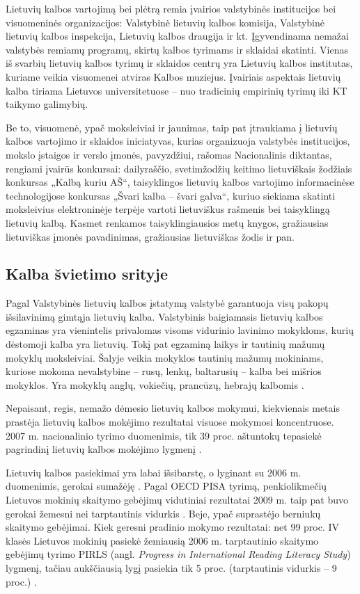 \begin{multicols}{2}
    Lietuvių kalbos vartojimą bei plėtrą remia įvairios valstybinės institucijos bei visuomeninės organizacijos: Valstybinė lietuvių kalbos komisija, Valstybinė lietuvių kalbos inspekcija, Lietuvių kalbos draugija ir kt. Įgyvendinama nemažai valstybės remiamų programų, skirtų kalbos tyrimams ir sklaidai skatinti.
Vienas iš svarbių lietuvių kalbos tyrimų ir sklaidos centrų yra Lietuvių kalbos institutas, kuriame veikia visuomenei atviras Kalbos muziejus. Įvairiais aspektais lietuvių kalba tiriama Lietuvos universitetuose – nuo tradicinių empirinių tyrimų iki KT taikymo galimybių.

Be to, visuomenė, ypač moksleiviai ir jaunimas, taip pat įtraukiama į lietuvių kalbos vartojimo ir sklaidos iniciatyvas, kurias organizuoja valstybės institucijos, mokslo įstaigos ir verslo įmonės, pavyzdžiui, rašomas Nacionalinis diktantas, rengiami įvairūs konkursai: dailyraščio, svetimžodžių keitimo lietuviškais žodžiais konkursas „Kalbą kuriu AŠ“, taisyklingos lietuvių kalbos vartojimo informacinėse technologijose konkursas „Švari kalba – švari galva“, kuriuo siekiama skatinti moksleivius elektroninėje terpėje vartoti lietuviškus rašmenis bei taisyklingą lietuvių kalbą. Kasmet renkamos taisyklingiausios metų knygos, gražiausias lietuviškas įmonės pavadinimas, gražiausias lietuviškas žodis ir pan.

\subsection{Kalba švietimo srityje}

Pagal Valstybinės lietuvių kalbos įstatymą valstybė garantuoja visų pakopų išsilavinimą gimtąja lietuvių kalba. Valstybinis baigiamasis lietuvių kalbos egzaminas yra vienintelis privalomas visoms vidurinio lavinimo mokykloms, kurių dėstomoji kalba yra lietuvių. Tokį pat egzaminą laikys ir tautinių mažumų mokyklų moksleiviai. Šalyje veikia mokyklos tautinių mažumų mokiniams, kuriose mokoma nevalstybine – rusų, lenkų, baltarusių – kalba bei mišrios mokyklos. Yra mokyklų anglų, vokiečių, prancūzų, hebrajų kalbomis \cite{smm1}.  

    Nepaisant, regis, nemažo dėmesio lietuvių kalbos mokymui, kiekvienais metais prastėja lietuvių kalbos mokėjimo rezultatai visuose mokymosi koncentruose. 2007 m. nacionalinio tyrimo duomenimis, tik 39 proc. aštuntokų tepasiekė pagrindinį lietuvių kalbos mokėjimo lygmenį \cite{smm1}.   

    Lietuvių kalbos pasiekimai yra labai išsibarstę, o lyginant su 2006 m. duomenimis, gerokai sumažėję \cite{smm2}.  Pagal OECD PISA tyrimą, penkiolikmečių Lietuvos mokinių skaitymo gebėjimų vidutiniai rezultatai 2009 m. taip pat buvo gerokai žemesni nei tarptautinis vidurkis \cite{nec1}.  Beje, ypač suprastėjo berniukų skaitymo gebėjimai. Kiek geresni pradinio mokymo rezultatai: net 99 proc. IV klasės Lietuvos mokinių pasiekė žemiausią 2006 m. tarptautinio skaitymo gebėjimų tyrimo PIRLS (angl. \textit{Progress in International Reading Literacy Study}) lygmenį, tačiau aukščiausią lygį pasiekia tik 5 proc. (tarptautinis vidurkis – 9 proc.) \cite{nec2}.   


\end{multicols}
